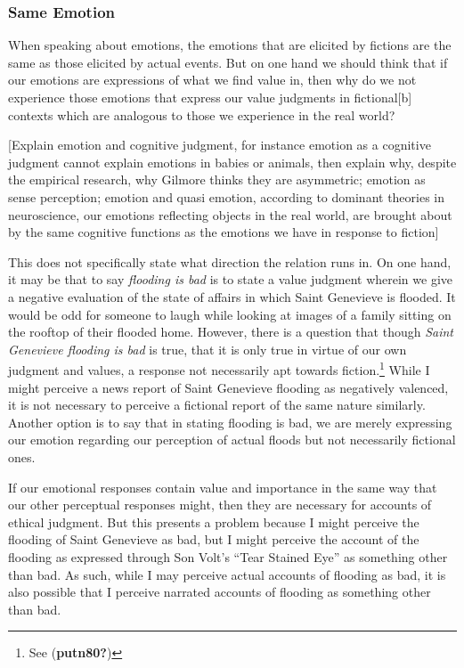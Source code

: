 \documentclass[12pt]{book}
\theoremstyle{definition}
\theoremstyle{remark}
\begin{document}
\subsubsection*{Same Emotion}\label{same-emotion}

When speaking about emotions, the emotions that are elicited by fictions are the same as those elicited by actual events. But on one hand we should think that if our emotions are expressions of what we find value in, then why do we not experience those emotions that express our value judgments in fictional{[}b{]} contexts which are analogous to those we experience in the real world?

{[}Explain emotion and cognitive judgment, for instance emotion as a cognitive judgment cannot explain emotions in babies or animals, then explain why, despite the empirical research, why Gilmore thinks they are asymmetric; emotion as sense perception; emotion and quasi emotion, according to dominant theories in neuroscience, our emotions reflecting objects in the real world, are brought about by the same cognitive functions as the emotions we have in response to fiction{]}

This does not specifically state what direction the relation runs in. On one hand, it may be that to say \emph{flooding is bad} is to state a value judgment wherein we give a negative evaluation of the state of affairs in which Saint Genevieve is flooded. It would be odd for someone to laugh while looking at images of a family sitting on the rooftop of their flooded home. However, there is a question that though \emph{Saint Genevieve flooding is bad} is true, that it is only true in virtue of our own judgment and values, a response not necessarily apt towards fiction.\footnote{See (\textbf{putn80?})} While I might perceive a news report of Saint Genevieve flooding as negatively valenced, it is not necessary to perceive a fictional report of the same nature similarly. Another option is to say that in stating flooding is bad, we are merely expressing our emotion regarding our perception of actual floods but not necessarily fictional ones.

If our emotional responses contain value and importance in the same way that our other perceptual responses might, then they are necessary for accounts of ethical judgment. But this presents a problem because I might perceive the flooding of Saint Genevieve as bad, but I might perceive the account of the flooding as expressed through Son Volt's ``Tear Stained Eye'' as something other than bad. As such, while I may perceive actual accounts of flooding as bad, it is also possible that I perceive narrated accounts of flooding as something other than bad.
\end{document}
